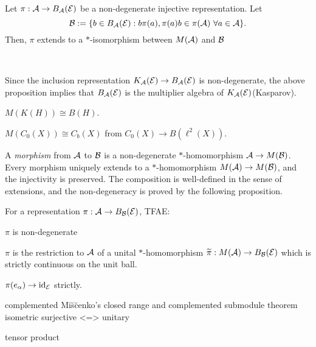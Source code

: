 \documentclass{../../../small}
\begin{document}
\begin{prop}
Let $\pi:\mathcal{A}\to B_{\mathcal{A}}(\mathcal{E})$ be a non-degenerate injective representation.
Let
\[\mathcal{B}:=\{b\in B_{\mathcal{A}}(\mathcal{E}):b\pi(a),\pi(a)b\in\pi(\mathcal{A})\ \forall a\in\mathcal{A}\}.\]
Then, $\pi$ extends to a $*$-isomorphism between $M(\mathcal{A})$ and $\mathcal{B}$
\end{prop}
\begin{pf}

\end{pf}

\begin{ex}\,
\begin{parts}
\item
Since the inclusion representation $K_{\mathcal{A}}(\mathcal{E})\to B_{\mathcal{A}}(\mathcal{E})$ is non-degenerate, the above proposition implies that $B_{\mathcal{A}}(\mathcal{E})$ is the multiplier algebra of $K_{\mathcal{A}}(\mathcal{E})$(Kasparov).
\item $M(K(H))\cong B(H)$.
\item $M(C_0(X))\cong C_b(X)$ from $C_0(X)\to B(\ell^2(X))$.
\end{parts}
\end{ex}

\begin{defn}
A \emph{morphism} from $\mathcal{A}$ to $\mathcal{B}$ is a non-degenerate $*$-homomorphism $\mathcal{A}\to M(\mathcal{B})$.
Every morphism uniquely extends to a $*$-homomorphism $M(\mathcal{A})\to M(\mathcal{B})$, and the injectivity is preserved.
The composition is well-defined in the sense of extensions, and the non-degeneracy is proved by the following proposition.
\end{defn}
\begin{lem}
For a representation $\pi:\mathcal{A}\to B_{\mathcal{B}}(\mathcal{E})$, TFAE:
\begin{parts}
\item $\pi$ is non-degenerate
\item $\pi$ is the restriction to $\mathcal{A}$ of a unital $*$-homomorphism $\widetilde\pi:M(\mathcal{A})\to B_{\mathcal{B}}(\mathcal{E})$ which is strictly continuous on the unit ball.
\item $\pi(e_\alpha)\to\operatorname{id}_{\mathcal{E}}$ strictly.
\end{parts}
\end{lem}





complemented
Mi\u s\u cenko's closed range and complemented submodule theorem
isometric surjective <=> unitary

tensor product
\end{document}
